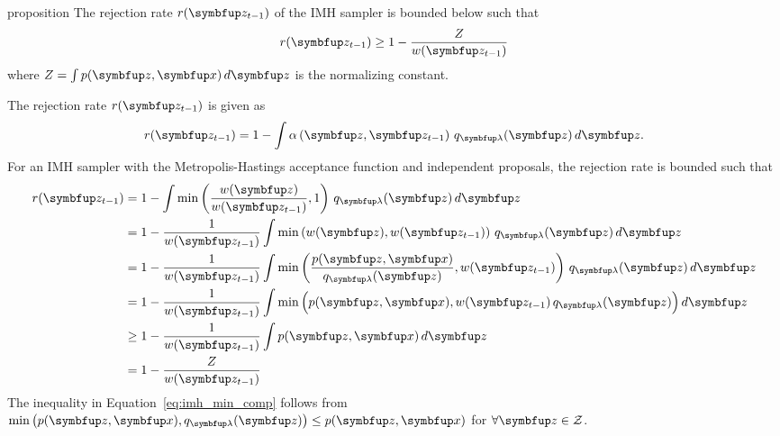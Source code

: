 
\begin{theoremEnd}[]{proposition}\label{thm:imh_bound}
  The rejection rate \(r(\vz_{t-1})\) of the IMH sampler is bounded below such that
  \[
  r(\vz_{t-1}) \geq 1 - \frac{Z}{w(\vz_{t-1})} 
  \]
  where \(Z=\int p(\vz,\vx) \, d\vz\) is the normalizing constant.
\end{theoremEnd}
\begin{proofEnd}
  The rejection rate \(r(\vz_{t-1})\) is given as
  \begin{align}
    r(\vz_{t-1}) = 1 - \int \alpha\left(\vz, \vz_{t-1} \right) \, q_{\vlambda}(\vz) \, d\vz.
  \end{align}
  For an IMH sampler with the Metropolis-Hastings acceptance function and independent proposals, the rejection rate is bounded such that
  \begin{align}
    r(\vz_{t-1})
    &= 1 - \int \min\left(\frac{w(\vz)}{w(\vz_{t-1})}, 1 \right) \, q_{\vlambda}(\vz)\,d\vz \\
    &= 1 - \frac{1}{w(\vz_{t-1})} \int \min\left(w(\vz), w(\vz_{t-1})\right) \, q_{\vlambda}(\vz)\,d\vz \\
    &= 1 - \frac{1}{w(\vz_{t-1})} \int \min\left(\frac{p(\vz,\vx)}{q_{\vlambda}(\vz)}, w(\vz_{t-1})\right) \, q_{\vlambda}(\vz)\,d\vz \\
    &=    1 - \frac{1}{w(\vz_{t-1})} \int \min\Big(p(\vz,\vx), w(\vz_{t-1})\,q_{\vlambda}(\vz)\Big) \, d\vz  \\
    &\geq 1 - \frac{1}{w(\vz_{t-1})} \int p(\vz,\vx) \, d\vz \label{eq:imh_min_comp} \\
    &=    1 - \frac{Z}{w(\vz_{t-1})} 
  \end{align}
  The inequality in Equation~\eqref{eq:imh_min_comp} follows from \(\min\big(p(\vz,\vx), q_{\vlambda}(\vz)\big) \leq p(\vz,\vx) \) for \(\forall \vz \in \mathcal{Z}\).
\end{proofEnd}

